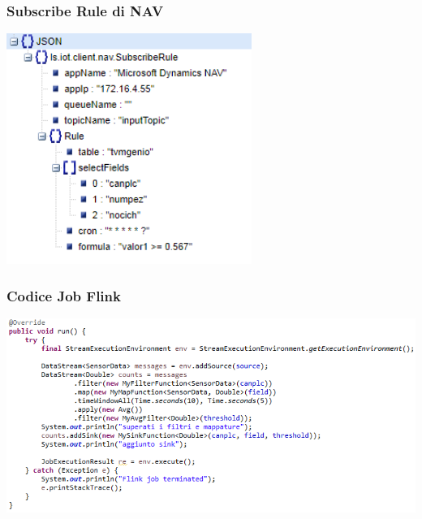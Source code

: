 \documentclass{beamer}
\begin{document}
\begin{frame}
\frametitle{Subscribe Rule di NAV}
\includegraphics[width=0.6\textwidth]{images/subscribe-json-2.png}
\end{frame}

\begin{frame}
\frametitle{Codice Job Flink}
\includegraphics[width=1\textwidth]{images/flink-job.png}
\end{frame}
\end{document}
